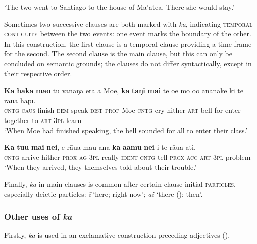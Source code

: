 \glt 
‘The two went to Santiago to the house of Ma’atea. There she would stay.’ \textstyleExampleref{[R210.221]} 
\z

Sometimes two successive clauses are both marked with \textit{ka}, indicating \textsc{temporal contiguity} between the two events: one event marks the boundary of the other. In this construction, the first clause is a temporal clause providing a time frame for the second. The second clause is the main clause, but this can only be concluded on semantic grounds; the clauses do not differ syntactically, except in their respective order. 

\ea\label{ex:7.52}
\gll \textbf{Ka} \textbf{haka} \textbf{mao} tū vānaŋa era a Moe, \textbf{ka} \textbf{taŋi} \textbf{mai} te oe  mo o{\ꞌ}o ananake ki te rāua hāpī.\\
\textsc{cntg} \textsc{caus} finish \textsc{dem} speak \textsc{dist} \textsc{prop} Moe \textsc{cntg} cry hither \textsc{art} bell  for enter together to \textsc{art} \textsc{3pl} learn\\

\glt 
‘When Moe had finished speaking, the bell sounded for all to enter their class.’ \textstyleExampleref{[R315.075]} 
\z

\ea\label{ex:7.53}
\gll \textbf{Ka} \textbf{tu{\ꞌ}u} \textbf{mai} \textbf{nei}, e rāua mau {\ꞌ}ana \textbf{ka} \textbf{{\ꞌ}a{\ꞌ}amu} \textbf{nei}  i te rāua {\ꞌ}ati.\\
\textsc{cntg} arrive hither \textsc{prox} \textsc{ag} \textsc{3pl} really \textsc{ident} \textsc{cntg} tell \textsc{prox}  \textsc{acc} \textsc{art} \textsc{3pl} problem\\

\glt 
‘When they arrived, they themselves told about their trouble.’ \textstyleExampleref{[R361.035]} 
\z

Finally, \textit{ka} in main clauses is common after certain clause-initial \textsc{particles}, especially deictic particles: \textit{{\ꞌ}ī} ‘here; right now’; \textit{{\ꞌ}ai} ‘there (); then’.

\subsubsection[Other uses of ka]{Other uses of \textit{ka}}\label{sec:7.2.6.4}

Firstly, \textit{ka} is used in an exclamative construction preceding adjectives ().

